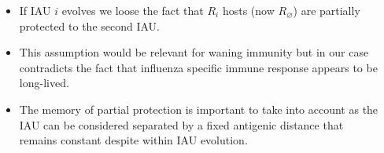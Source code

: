 \documentclass{beamer}
\begin{document}
\begin{frame}
\begin{columns}
\begin{column}{0.3 \linewidth}
    \end{column}
    \begin{column}{0.7 \linewidth}
      \begin{itemize}
      \item If IAU $i$ evolves we loose the fact that $R_i$ hosts (now
        $R_\varnothing$) are partially protected to the second IAU.
      \item This assumption would be relevant for waning immunity but in our case
        contradicts the fact that influenza specific immune response appears
        to be long-lived.
      \item The memory of partial protection is important to
        take into account as the IAU can be considered separated by a fixed
        antigenic distance that remains constant despite within IAU evolution.
      \end{itemize}
    \end{column}
  \end{columns}

\end{frame}
\end{document}
